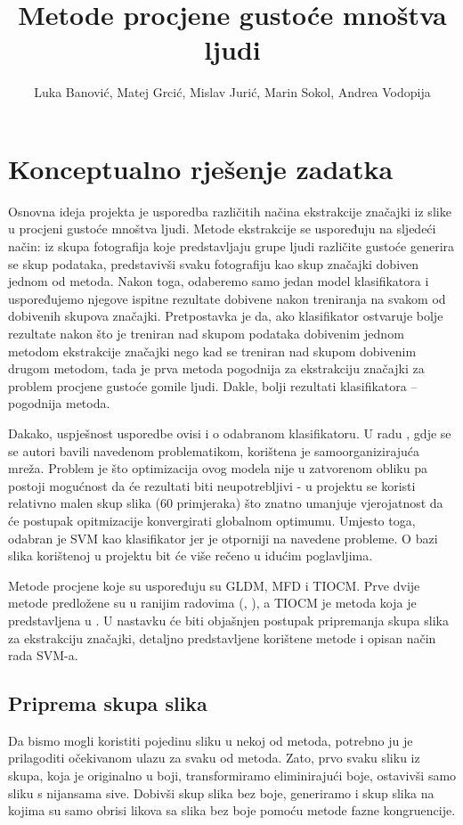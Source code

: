 \documentclass{report}
\begin{document}
\title{Metode procjene gustoće mnoštva ljudi}
\author{Luka Banović, Matej Grcić, Mislav Jurić, Marin Sokol, Andrea Vodopija}

\maketitle

\chapter{Konceptualno rješenje zadatka}
Osnovna ideja projekta je usporedba različitih načina ekstrakcije značajki iz slike u procjeni gustoće mnoštva ljudi. Metode ekstrakcije se uspoređuju na sljedeći način: iz skupa fotografija koje predstavljaju grupe ljudi različite gustoće generira se skup podataka, predstavivši svaku fotografiju kao skup značajki dobiven jednom od metoda. Nakon toga, odaberemo samo jedan model klasifikatora i uspoređujemo njegove ispitne rezultate dobivene nakon treniranja na svakom od dobivenih skupova značajki. Pretpostavka je da, ako klasifikator ostvaruje bolje rezultate nakon što je treniran nad skupom podataka dobivenim jednom metodom ekstrakcije značajki nego kad se treniran nad skupom dobivenim drugom metodom, tada je prva metoda pogodnija za ekstrakciju značajki za problem procjene gustoće gomile ljudi. Dakle, bolji rezultati klasifikatora – pogodnija metoda.

Dakako, uspješnost usporedbe ovisi i o odabranom klasifikatoru. U radu \cite{main_paper}, gdje se se autori bavili navedenom problematikom, korištena je samoorganizirajuća mreža. Problem je što optimizacija ovog modela nije u zatvorenom obliku pa postoji mogućnost da će rezultati biti neupotrebljivi - u projektu se koristi relativno malen skup slika (60 primjeraka) što znatno umanjuje vjerojatnost da će postupak opitmizacije konvergirati globalnom optimumu. Umjesto toga, odabran je SVM kao klasifikator jer je otporniji na navedene probleme. O bazi slika korištenoj u projektu bit će više rečeno u idućim poglavljima.

Metode procjene koje su uspoređuju su GLDM, MFD i TIOCM. Prve dvije metode predložene su u ranijim radovima (\cite{gldm}, \cite{mfd}), a TIOCM je metoda koja je predstavljena u \cite{main_paper}. U nastavku će biti objašnjen postupak pripremanja skupa slika za ekstrakciju značajki, detaljno predstavljene korištene metode i opisan način rada SVM-a.

\section{Priprema skupa slika}
Da bismo mogli koristiti pojedinu sliku u nekoj od metoda, potrebno ju je prilagoditi očekivanom ulazu za svaku od metoda. Zato, prvo svaku sliku iz skupa, koja je originalno u boji, transformiramo eliminirajući boje, ostavivši samo sliku s nijansama sive. Dobivši skup slika bez boje, generiramo i skup slika na kojima su samo obrisi likova sa slika bez boje pomoću metode fazne kongruencije.
\end{document}
